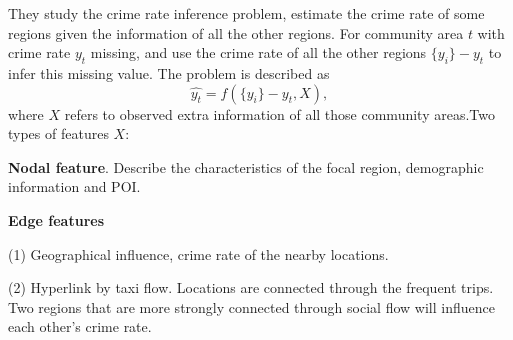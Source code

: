 \documentclass[10pt,letterpaper,english]{article}
\begin{document}
They study the crime rate inference problem, estimate the crime rate of some regions given the information of all the other regions. For community area $t$ with crime rate $y_t$ missing, and  use the crime rate of all the other regions $\{y_i\}-y_t$ to infer this missing value. The problem is described as
$$\hat{y_t}=f(\{y_i\}- y_t,X), $$
where $X$ refers to observed extra information of all those community areas.Two types of features $X$:

\begin{description}
\item \textbf{Nodal feature}. Describe the characteristics of the focal region, demographic information and POI.

\item \textbf{Edge features}

(1) Geographical influence, crime rate of the nearby locations. 

(2) Hyperlink by taxi flow. Locations are connected through the frequent trips.  Two regions that are more strongly connected through social flow will influence each other’s crime rate.
\end{description}


 
\end{document}
